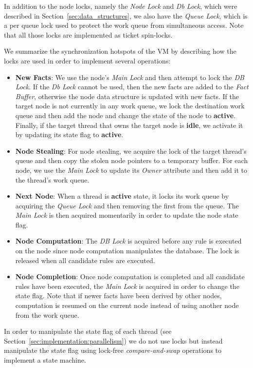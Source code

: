 
In addition to the node locks, namely the \emph{Node Lock} and \emph{Db Lock},
which were described in Section~\ref{sec:data_structures}, we also have the
\emph{Queue Lock}, which is a per queue lock used to protect the work queue from
simultaneous access. Note that all those locks are implemented as ticket
spin-locks.

We summarize the synchronization hotspots of the VM by describing how the locks
are used in order to implement several operations:

\begin{itemize}

   \item \textbf{New Facts}: We use the node's \emph{Main Lock} and then attempt
      to lock the \emph{DB Lock}. If the \emph{Db Lock} cannot be used, then the
      new facts are added to the \emph{Fact Buffer}, otherwise the node data
      structure is updated with new facts. If the target node is not currently
      in any work queue, we lock the destination work queue and then add the
      node and change the state of the node to \textbf{active}. Finally, if the
      target thread that owns the target node is \textbf{idle}, we activate it
      by updating its state flag to \textbf{active}.

   \item \textbf{Node Stealing}: For node stealing, we acquire the lock of the
      target thread's queue and then copy the stolen node pointers to a temporary
      buffer. For each node, we use the \emph{Main Lock} to update its
      \emph{Owner} attribute and then add it to the thread's work queue.

   \item \textbf{Next Node}: When a thread is \textbf{active} state, it locks
      its work queue by acquiring the \emph{Queue Lock} and then removing the
      first from the queue. The \emph{Main Lock} is then acquired momentarily in
      order to update the node state flag.

   \item \textbf{Node Computation}: The \emph{DB Lock} is acquired before
      any rule is executed on the node since node computation manipulates the
      database. The lock is released when all candidate rules are executed.

   \item \textbf{Node Completion}: Once node computation is completed and all
      candidate rules have been executed, the \emph{Main Lock} is acquired in
      order to change the state flag. Note that if newer facts have been derived
      by other nodes, computation is resumed on the current node instead of
      using another node from the work queue.

\end{itemize}

In order to manipulate the state flag of each thread (see
Section~\ref{sec:implementation:parallelism}) we do not use locks but instead
manipulate the state flag using lock-free \emph{compare-and-swap} operations to
implement a state machine.

